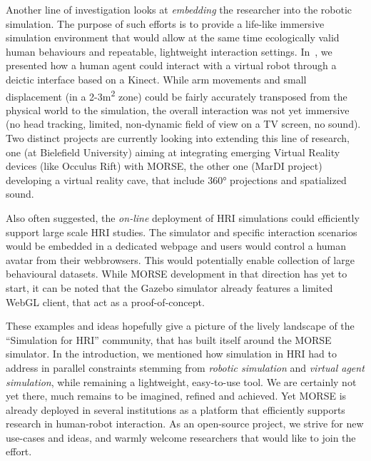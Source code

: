 \documentclass[letterpaper, 10pt, conference]{ieeeconf}
\begin{document}
Another line of investigation looks at \emph{embedding} the researcher into the
robotic simulation. The purpose of such efforts is to provide a life-like
immersive simulation environment that would allow at the same time ecologically
valid human behaviours and repeatable, lightweight interaction settings.
In~\cite{lemaignan2012morse}, we presented how a human agent could interact with
a virtual robot through a deictic interface based on a Kinect. While arm
movements and small displacement (in a 2-3m\textsuperscript{2} zone) could be
fairly accurately transposed from the physical world to the simulation, the
overall interaction was not yet immersive (no head tracking, limited,
non-dynamic field of view on a TV screen, no sound). Two distinct projects are
currently looking into extending this line of research, one (at Bielefield
University) aiming at integrating emerging Virtual Reality devices (like Occulus
Rift) with MORSE, the other one (MarDI project) developing a virtual reality
cave, that include 360° projections and spatialized sound.

Also often suggested, the \emph{on-line} deployment of HRI simulations could
efficiently support large scale HRI studies. The simulator and specific
interaction scenarios would be embedded in a dedicated webpage and users would
control a human avatar from their webbrowsers. This would potentially enable
collection of large behavioural datasets. While MORSE development in that
direction has yet to start, it can be noted that the Gazebo simulator already
features a limited WebGL client, that act as a proof-of-concept.



These examples and ideas hopefully give a picture of the lively landscape of the
``Simulation for HRI'' community, that has built itself around the MORSE
simulator.  In the introduction, we mentioned how simulation in HRI had to
address in parallel constraints stemming from \emph{robotic simulation} and
\emph{virtual agent simulation}, while remaining a lightweight, easy-to-use
tool. We are certainly not yet there, much remains to be imagined, refined and
achieved.  Yet MORSE is already deployed in several institutions as a platform
that efficiently supports research in human-robot interaction. As an open-source
project, we strive for new use-cases and ideas, and warmly welcome researchers
that would like to join the effort.





\end{document}
